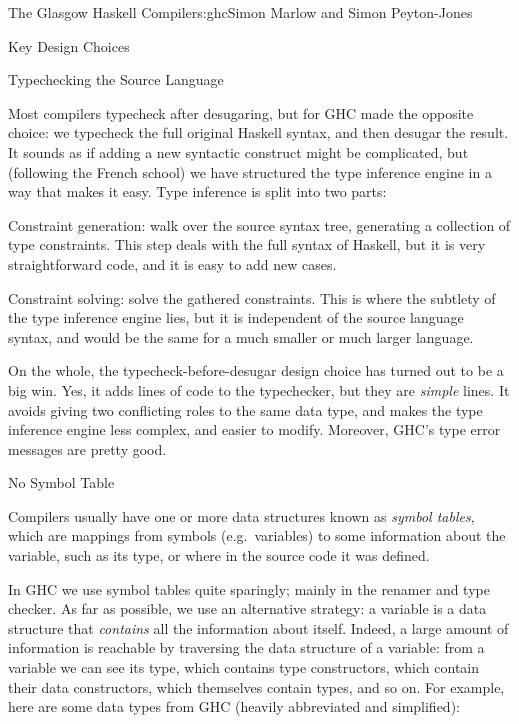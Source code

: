 \begin{aosachapter}{The Glasgow Haskell Compiler}{s:ghc}{Simon Marlow and Simon Peyton-Jones}
\begin{aosasect1}{Key Design Choices}
\begin{aosasect2}{Typechecking the Source Language}
\begin{aosaitemize}
\end{aosaitemize}

Most compilers typecheck after desugaring, but for GHC made the
opposite choice: we typecheck the full original Haskell syntax, and
then desugar the result.  It sounds as if adding a new syntactic
construct might be complicated, but (following the French school) we
have structured the type inference engine in a way that makes it
easy. Type inference is split into two parts:

\begin{aosaenumerate}

\item Constraint generation: walk over the source syntax tree,
  generating a collection of type constraints.  This step deals with
  the full syntax of Haskell, but it is very straightforward code, and
  it is easy to add new cases.

\item Constraint solving: solve the gathered constraints.  This is
  where the subtlety of the type inference engine lies, but it is
  independent of the source language syntax, and would be the same for
  a much smaller or much larger language.

\end{aosaenumerate}

On the whole, the typecheck-before-desugar design choice has turned
out to be a big win.  Yes, it adds lines of code to the typechecker,
but they are \emph{simple} lines. It avoids giving two conflicting
roles to the same data type, and makes the type inference engine less
complex, and easier to modify. Moreover, GHC's type error messages are
pretty good.

\end{aosasect2}

\begin{aosasect2}{No Symbol Table}

Compilers usually have one or more data structures known as
\emph{symbol tables}, which are mappings from symbols
(e.g.\ variables) to some information about the variable, such as its
type, or where in the source code it was defined.

In GHC we use symbol tables quite sparingly; mainly in the renamer and
type checker.  As far as possible, we use an alternative strategy: a
variable is a data structure that \emph{contains} all the information
about itself.  Indeed, a large amount of information is reachable by
traversing the data structure of a variable: from a variable we can
see its type, which contains type constructors, which contain their
data constructors, which themselves contain types, and so on.  For
example, here are some data types from GHC (heavily abbreviated and
simplified):


\end{aosasect2}
\end{aosasect1}
\end{aosachapter}
